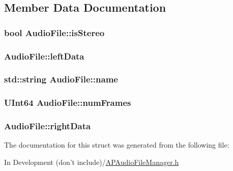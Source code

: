 \subsection{Member Data Documentation}
\hypertarget{struct_audio_file_a311b31a57c859cc21a1f68aff6e51ba9}{
\subsubsection[{is\+Stereo}]{\setlength{\rightskip}{0pt plus 5cm}bool Audio\+File\+::is\+Stereo}}\label{struct_audio_file_a311b31a57c859cc21a1f68aff6e51ba9}
\hypertarget{struct_audio_file_a51aaf4be88a23cadc1fb07a03ea5f2b6}{
\subsubsection[{left\+Data}]{ Audio\+File\+::left\+Data}}\label{struct_audio_file_a51aaf4be88a23cadc1fb07a03ea5f2b6}
\hypertarget{struct_audio_file_a16db0e4afba089b08ffe10d1c0acbb60}{
\subsubsection[{name}]{\setlength{\rightskip}{0pt plus 5cm}std\+::string Audio\+File\+::name}}\label{struct_audio_file_a16db0e4afba089b08ffe10d1c0acbb60}
\hypertarget{struct_audio_file_aa97443ea32087a1bf8274be526525236}{
\subsubsection[{num\+Frames}]{\setlength{\rightskip}{0pt plus 5cm}U\+Int64 Audio\+File\+::num\+Frames}}\label{struct_audio_file_aa97443ea32087a1bf8274be526525236}
\hypertarget{struct_audio_file_a15e6b7e17c2d9fddcf8b8256101b09ea}{
\subsubsection[{right\+Data}]{ Audio\+File\+::right\+Data}}\label{struct_audio_file_a15e6b7e17c2d9fddcf8b8256101b09ea}


The documentation for this struct was generated from the following file\+:\begin{DoxyCompactItemize}
\item 
In Development (don't include)/\hyperlink{_a_p_audio_file_manager_8h}{A\+P\+Audio\+File\+Manager.\+h}\end{DoxyCompactItemize}
